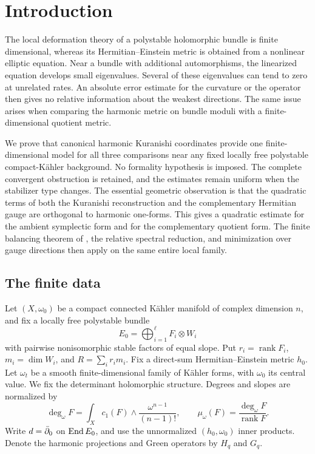 \section{Introduction}\label{sec:introduction}

The local deformation theory of a polystable holomorphic bundle is
finite dimensional, whereas its Hermitian--Einstein metric is obtained
from a nonlinear elliptic equation. Near a bundle with additional
automorphisms, the linearized equation develops small eigenvalues.
Several of these eigenvalues can tend to zero at unrelated rates.
An absolute error estimate for the curvature or the operator then gives
no relative information about the weakest directions. The same issue
arises when comparing the harmonic metric on bundle moduli with a
finite-dimensional quotient metric.

We prove that canonical harmonic Kuranishi coordinates provide one
finite-dimensional model for all three comparisons near any fixed
locally free polystable compact-K\"ahler background. No formality
hypothesis is imposed. The complete convergent obstruction is retained,
and the estimates remain uniform when the stabilizer type changes.
The essential geometric observation is that the quadratic terms of both
the Kuranishi reconstruction and the complementary Hermitian gauge are
orthogonal to harmonic one-forms. This gives a quadratic estimate for
the ambient symplectic form and for the complementary quotient form.
The finite balancing theorem of \cite[Theorem~2.1]{wuebben14}, the
relative spectral reduction, and minimization over gauge directions
then apply on the same entire local family.

\subsection{The finite data}
Let $(X,\omega_0)$ be a compact connected K\"ahler manifold of complex
dimension $n$, and fix a locally free polystable bundle
\begin{equation}\label{eq:split}
 E_0=\bigoplus_{i=1}^{\ell}F_i\otimes W_i
\end{equation}
with pairwise nonisomorphic stable factors of equal slope. Put
$r_i=\operatorname{rank}F_i$, $m_i=\dim W_i$, and
$R=\sum_i r_im_i$. Fix a direct-sum Hermitian--Einstein metric $h_0$.
Let $\omega_t$ be a smooth finite-dimensional family of K\"ahler forms,
with $\omega_0$ its central value. We fix the determinant holomorphic
structure. Degrees and slopes are normalized by
\[
 \deg_\omega F=\int_Xc_1(F)\wedge\frac{\omega^{n-1}}{(n-1)!},
 \qquad \mu_\omega(F)=\frac{\deg_\omega F}{\operatorname{rank}F}.
\]
Write $d=\bar\partial_0$ on $\operatorname{End} E_0$, and use the unnormalized
$(h_0,\omega_0)$ inner products. Denote the harmonic projections and
Green operators by $H_q$ and $G_q$.

